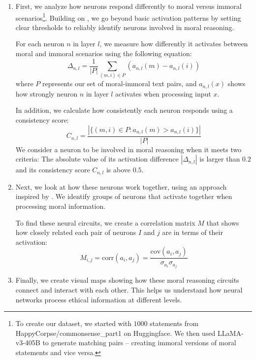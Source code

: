 \documentclass[runninghheads]{llncs}
\begin{document}
\begin{enumerate}

    \item First, we analyze how neurons respond differently to moral versus immoral scenarios\footnote{To create our dataset, we started with $1000$ statements from HappyCorpse\//commonsense\_part1 on Huggingface. We then used LLaMA-v3-405B to generate matching pairs -- creating immoral versions of moral statements and vice versa.}. Building on \cite{choi2024automatic}, we go beyond basic activation patterns by setting clear thresholds to reliably identify neurons involved in moral reasoning.

    For each neuron $n$ in layer $l$, we measure how differently it activates between moral and immoral scenarios using the following equation:
    \begin{equation}
        \Delta_{n,l} = \frac{1}{|P|}\sum_{(m,i) \in P} (a_{n,l}(m) - a_{n,l}(i))
        \label{eq:activation_difference}
    \end{equation}
    where $P$ represents our set of moral-immoral text pairs, and $a_{n,l}(x)$ shows how strongly neuron $n$ in layer $l$ activates when processing input $x$.
    
    In addition, we calculate how consistently each neuron responds using a consistency score:
    \begin{equation}
        C_{n,l} = \frac{|\{(m,i) \in P : a_{n,l}(m) > a_{n,l}(i)\}|}{|P|}
        \label{eq:consistency_score}
    \end{equation}
    We consider a neuron to be involved in moral reasoning when it meets two criteria: The absolute value of its activation difference $|\Delta_{n,l}|$ is larger than $0.2$ and its consistency score $C_{n,l}$ is above $0.5$.

    
    \item Next, we look at how these neurons work together, using an approach inspired by \cite{vitiello_context-aware_2024}. We identify groups of neurons that activate together when processing moral information. 
    
    To find these neural circuits, we create a correlation matrix $M$ that shows how closely related each pair of neurons $I$ and $j$ are in terms of their activation:
    \begin{equation}
        M_{i,j} = \text{corr}(a_i, a_j) = \frac{\text{cov}(a_i, a_j)}{\sigma_{a_i}\sigma_{a_j}}
        \label{eq:circuit_identification}
    \end{equation}
    

    
    \item Finally, we create visual maps showing how these moral reasoning circuits connect and interact with each other. This helps us understand how neural networks process ethical information at different levels.
\end{enumerate}
\end{document}
